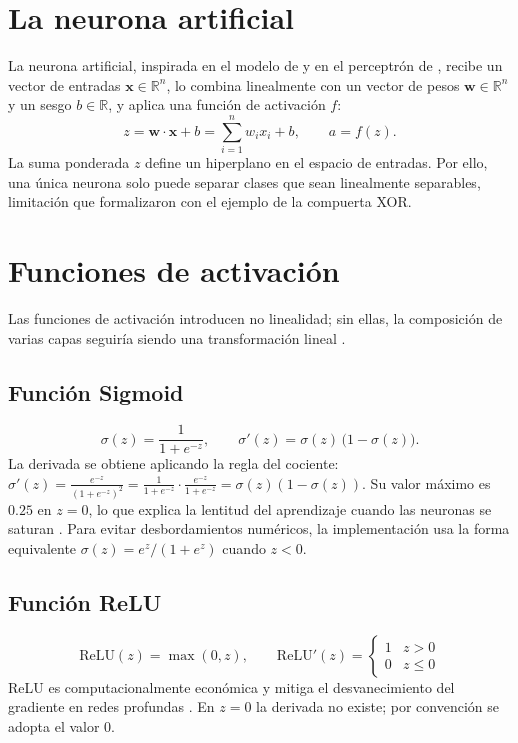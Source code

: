 \section{La neurona artificial}
La neurona artificial, inspirada en el modelo de \citet{mcculloch1943} y en el perceptrón de \citet{rosenblatt1958}, recibe un vector de entradas $\mathbf{x}\in\mathbb{R}^{n}$, lo combina linealmente con un vector de pesos $\mathbf{w}\in\mathbb{R}^{n}$ y un sesgo $b\in\mathbb{R}$, y aplica una función de activación $f$:
\begin{equation}
z = \mathbf{w}\cdot\mathbf{x} + b = \sum_{i=1}^{n} w_i x_i + b, \qquad a = f(z).\label{eq:neurona}
\end{equation}
La suma ponderada $z$ define un hiperplano en el espacio de entradas. Por ello, una única neurona solo puede separar clases que sean linealmente separables, limitación que \citet{minsky1969} formalizaron con el ejemplo de la compuerta XOR.

\section{Funciones de activación}
Las funciones de activación introducen no linealidad; sin ellas, la composición de varias capas seguiría siendo una transformación lineal \citep{goodfellow2016}.

\subsection{Función Sigmoid}
\begin{equation}
\sigma(z) = \frac{1}{1+e^{-z}}, \qquad \sigma'(z) = \sigma(z)\,\bigl(1-\sigma(z)\bigr).\label{eq:sigmoid}
\end{equation}
La derivada se obtiene aplicando la regla del cociente: $\sigma'(z) = \frac{e^{-z}}{(1+e^{-z})^2} = \frac{1}{1+e^{-z}}\cdot\frac{e^{-z}}{1+e^{-z}} = \sigma(z)(1-\sigma(z))$. Su valor máximo es $0.25$ en $z=0$, lo que explica la lentitud del aprendizaje cuando las neuronas se saturan \citep{lecun1998}. Para evitar desbordamientos numéricos, la implementación usa la forma equivalente $\sigma(z) = e^{z}/(1+e^{z})$ cuando $z<0$.

\subsection{Función ReLU}
\begin{equation}
\mathrm{ReLU}(z) = \max(0, z), \qquad \mathrm{ReLU}'(z) = \begin{cases}1 & z>0\\ 0 & z\le 0\end{cases}\label{eq:relu}
\end{equation}
ReLU es computacionalmente económica y mitiga el desvanecimiento del gradiente en redes profundas \citep{glorot2010,he2015}. En $z=0$ la derivada no existe; por convención se adopta el valor $0$.

